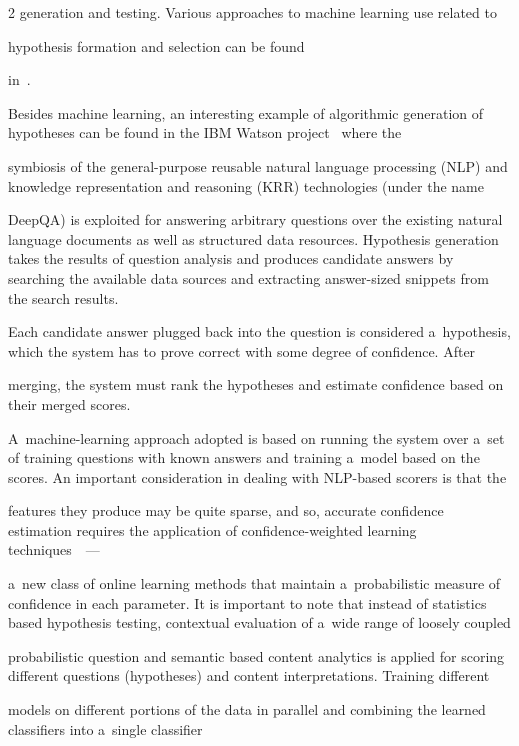 \begin{multicols}{2}
generation and testing. Various approaches to machine learning use related to


hypothesis formation and selection can be found


in~\cite{27-kl, 36-kl, 37-kl}.





  Besides machine learning, an interesting example of algorithmic generation of hypotheses can be found in the IBM Watson project~\cite{39-kl} where the


symbiosis of the  general-purpose reusable natural language processing (NLP) and knowledge representation and reasoning (KRR) technologies (under the name


DeepQA) is exploited for answering arbitrary questions over the existing natural language documents as well as structured data resources. Hypothesis generation takes the results of question analysis and produces candidate answers by searching the available data sources and extracting answer-sized snippets from the search results.


Each candidate answer plugged back into the question is considered a~hypothesis, which the system has to prove correct with some degree of confidence. After


merging, the system must rank the hypotheses and estimate confidence based on their merged scores.


A~machine-learning approach adopted is based on running the system over a~set of training questions with known answers and training a~model based on the scores. An important consideration in dealing with NLP-based scorers is that the


features they produce may be quite sparse, and so, accurate confidence estimation requires the application of confidence-weighted learning techniques~\cite{39-kl}~---


a~new class of online learning methods that maintain a~probabilistic measure of confidence in each parameter. It is important to note that instead of statistics based hypothesis testing, contextual evaluation of a~wide range of loosely coupled


probabilistic question and semantic based content analytics is applied for scoring different questions (hypotheses) and content interpretations. Training different


models on different portions of the data in parallel and combining the learned classifiers into a~single classifier



\end{multicols}
